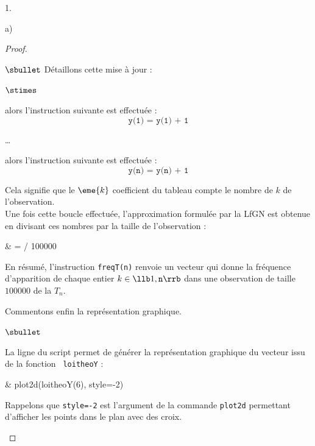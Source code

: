 \documentclass[11pt]{article}%
\begin{document}
\begin{noliste}{1.}
\begin{noliste}{a)}
\begin{proof}
\begin{noliste}{$\sbullet$}
        \noindent
        Détaillons cette mise à jour : 
        \begin{noliste}{$\stimes$}
        \item {} alors
          l'instruction suivante est effectuée :
          \[
          \texttt{y(1) = y(1) + 1}
          \]
        \item \ldots
        \item {} alors l'instruction
          suivante est effectuée :
          \[
          \texttt{y(n) = y(n) + 1}
          \]
        \end{noliste}
        Cela signifie que le $\eme{k}$ coefficient du tableau
        compte le nombre de $k$ de l'observation.\\
        Une fois cette boucle effectuée, l'approximation formulée par
        la LfGN est obtenue en divisant ces nombres par la taille de
        l'observation :
        \begin{scilabC}{6}
          & \quad {} =  / 100000 \nl %
        \end{scilabC}
      \item En résumé, l'instruction {\tt freqT(n)} renvoie un vecteur
        qui donne la fréquence d'apparition de chaque entier $k \in
        \llb 1, {\tt n} \rrb$ dans une observation de taille $100000$
        de la \var $T_n$. %
      \end{noliste}
      
      
      
      
      
      \noindent
      Commentons enfin la représentation graphique.
      \begin{noliste}{$\sbullet$}
      \item La ligne  du script permet de générer la
        représentation graphique du vecteur issu de la fonction {\tt
          loitheoY} :
        \begin{scilabC}{9}
          &  plot2d(loitheoY(6), style=-2) \nl %
        \end{scilabC}
        Rappelons que {\tt style=-2} est l'argument de la commande
        {\tt plot2d} permettant d'afficher les points dans le plan
        avec des croix.  %


\end{noliste}
\end{proof}
\end{noliste}
\end{noliste}
\end{document}
